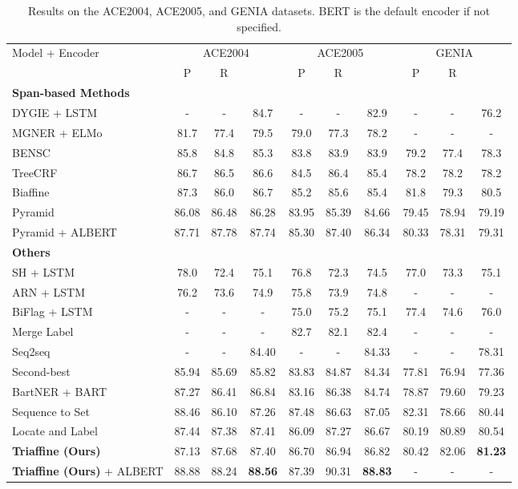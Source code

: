 \documentclass[11pt]{article}
\begin{document}
\begin{table*}[ht]
\small
\centering
\begin{tabular}{lccccccccc}
\toprule
Model + Encoder & \multicolumn{3}{c}{ACE2004} & \multicolumn{3}{c}{ACE2005} & \multicolumn{3}{c}{GENIA} \\
& P & R &  & P & R & & P & R &   \\
\midrule
\bf{Span-based Methods} \\
DYGIE \cite{dygie} + LSTM & - & - & 84.7 & - & - & 82.9 & - & - & 76.2 \\
MGNER \cite{mgner} + ELMo & 81.7 & 77.4 & 79.5 & 79.0 & 77.3 & 78.2 & - & - & -  \\
BENSC \cite{bensc} & 85.8 & 84.8 & 85.3 & 83.8 & 83.9 & 83.9 & 79.2 & 77.4 & 78.3  \\
TreeCRF \cite{fu2021nested}  & 86.7 & 86.5 & 86.6 & 84.5 & 86.4 & 85.4 & 78.2 & 78.2 & 78.2 \\
Biaffine \cite{yu2020named}  & 87.3 & 86.0 & 86.7 & 85.2 & 85.6 & 85.4 & 81.8 & 79.3 & 80.5 \\
Pyramid \cite{wang2020pyramid}  & 86.08 & 86.48 & 86.28 & 83.95 & 85.39 & 84.66 & 79.45 & 78.94 & 79.19 \\
Pyramid \cite{wang2020pyramid} + ALBERT & 87.71 & 87.78 & 87.74 & 85.30 & 87.40 & 86.34 & 80.33 & 78.31 & 79.31 \\
\midrule
\bf{Others} \\
SH \cite{sh} + LSTM & 78.0 & 72.4 & 75.1 & 76.8 & 72.3 & 74.5 & 77.0 & 73.3 & 75.1 \\
ARN \cite{lin2019sequence} + LSTM & 76.2 & 73.6 & 74.9 & 75.8 & 73.9 & 74.8 & - & - & - \\
BiFlag \cite{luo2020bipartite} + LSTM & - & - & - & 75.0 & 75.2 & 75.1 & 77.4 & 74.6 & 76.0 \\
Merge Label \cite{mergelabel} & - & - & - & 82.7 & 82.1 & 82.4 & - & - & - \\
Seq2seq \cite{strakova2019neural} & - & - & 84.40 & - & - & 84.33 & - & - & 78.31 \\
Second-best \cite{second} & 85.94 & 85.69 & 85.82 & 83.83 & 84.87 & 84.34 & 77.81 & 76.94 & 77.36 \\
BartNER \cite{bartner} + BART  & 87.27 & 86.41 & 86.84 & 83.16 & 86.38 & 84.74 & 78.87 & 79.60 & 79.23 \\
Sequence to Set \cite{tan2021sequence}   & 88.46 & 86.10 & 87.26 & 87.48 & 86.63 & 87.05 & 82.31 & 78.66 & 80.44 \\
Locate and Label \cite{shen2021locate}  & 87.44 & 87.38 & 87.41 & 86.09 & 87.27 & 86.67 & 80.19 & 80.89 & 80.54 \\
\midrule
{\bf Triaffine (Ours)} & 87.13 & 87.68 & 87.40 & 86.70 & 86.94 & 86.82 & 80.42 & 82.06 & \textbf{81.23} \\
{\bf Triaffine (Ours)} + ALBERT & 88.88 & 88.24 & \textbf{88.56} & 87.39 & 90.31 & \textbf{88.83} & - & - & - \\
\bottomrule
\end{tabular}
\caption{Results on the ACE2004, ACE2005, and GENIA datasets. BERT is the default encoder if not specified.}
\label{main results}
\end{table*}
\end{document}
